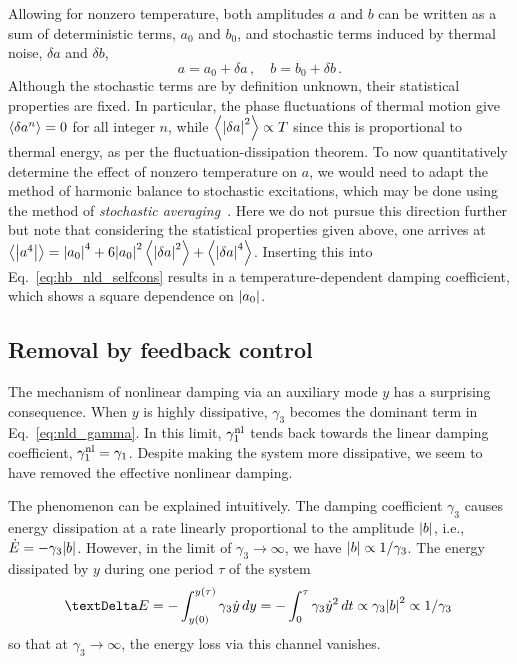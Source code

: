 Allowing for nonzero temperature, both amplitudes $a$ and $b$ can be written as a sum of deterministic terms, $a_0$ and $b_0$, and stochastic terms induced by thermal noise, $\delta a$ and $\delta b$,
\begin{equation}
a = a_0 + \delta a \,, \quad b = b_0 + \delta b \,. 
\end{equation} 
Although the stochastic terms are by definition unknown, their statistical properties are fixed. In particular, the phase fluctuations of thermal motion give $\expval{\delta a^n} = 0$ for all integer $n$, while $\expval{ \abs{\delta a}^2} \propto T $ since this is proportional to thermal energy, as per the fluctuation-dissipation theorem. To now quantitatively determine the effect of nonzero temperature on $a$, we would need to adapt the method of harmonic balance to stochastic excitations, which may be done using the method of \textit{stochastic averaging}~\cite{Roberts_1986, Khasminskii_1966, Toni_thesis}. Here we do not pursue this direction further but note that considering the statistical properties given above, one arrives at $\expval{\abs{a^4}} = \abs{a_0}^4 + 6 \abs{a_0}^2 \expval{ \abs{\delta a}^2} + \expval{\abs{\delta a}^4}$. Inserting this into Eq.~\eqref{eq:hb_nld_selfcons} results in a temperature-dependent damping coefficient, which shows a square dependence on $\abs{a_0}$.
\subsection{Removal by feedback control} \label{sec:hb_damping_the_damping}

The mechanism of nonlinear damping via an auxiliary mode $y$ has a surprising consequence. When $y$ is highly dissipative, $\gamma_3$ becomes the dominant term in Eq.~\eqref{eq:nld_gamma}. In this limit, $\gamma_1^{\rm nl}$ tends back towards the linear damping coefficient, $\gamma_1^{\rm nl} = \gamma_1$. Despite making the system more dissipative, we seem to have removed the effective nonlinear damping.

The phenomenon can be explained intuitively. The damping coefficient $\gamma_3$ causes energy dissipation at a rate linearly proportional to the amplitude $\abs{b}$, i.e., $\dot{E} = -\gamma_3 \abs{b}$. However, in the limit of $\gamma_3 \rightarrow \infty$, we have $ \abs{b} \propto 1/\gamma_3$.
The energy dissipated by $y$ during one period $\tau$ of the system
\begin{equation}
\Delta E = -\int_{y(0)}^{y(\tau)} \gamma_3 \dot{y} \, dy = -\int_0^\tau \gamma_3 \dot{y}^2  \, dt\propto \gamma_3 \abs{b}^2 \propto 1 / \gamma_3\,
\end{equation}
so that at $\gamma_3 \rightarrow \infty$, the energy loss via this channel vanishes. 

